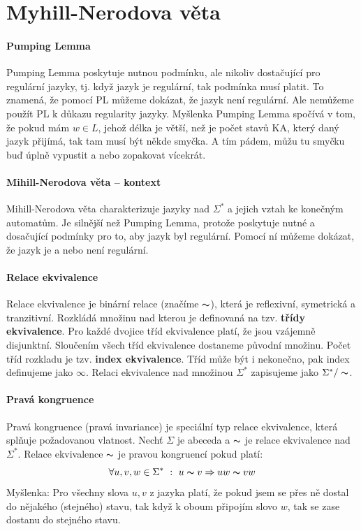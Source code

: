 
\section{Myhill-Nerodova věta}

\paragraph*{Pumping Lemma} Pumping Lemma poskytuje nutnou podmínku, ale nikoliv dostačující pro regulární jazyky, tj. když jazyk je regulární, tak podmínka musí platit. To znamená, že pomocí PL můžeme dokázat, že jazyk není regulární. Ale nemůžeme použít PL k důkazu regularity jazyky. Myšlenka Pumping Lemma spočívá v tom, že pokud mám $w \in L$, jehož délka je větší, než je počet stavů KA, který daný jazyk přijímá, tak tam musí být někde smyčka. A tím pádem, můžu tu smyčku buď úplně vypustit a nebo zopakovat vícekrát.

\paragraph*{Mihill-Nerodova věta -- kontext} Mihill-Nerodova věta charakterizuje jazyky nad $\Sigma^*$ a jejich vztah ke konečným automatům. Je silnější než Pumping Lemma, protože poskytuje nutné a dosačující podmínky pro to, aby jazyk byl regulární. Pomocí ní můžeme dokázat, že jazyk je a nebo není regulární.

\paragraph*{Relace ekvivalence} Relace ekvivalence je binární relace (značíme $\thicksim$), která je reflexivní, symetrická a tranzitivní. Rozkládá množinu nad kterou je definovaná na tzv. \textbf{třídy ekvivalence}. Pro každé dvojice tříd ekvivalence platí, že jsou vzájemně disjunktní. Sloučením všech tříd ekvivalence dostaneme původní množinu. Počet tříd rozkladu je tzv. \textbf{index ekvivalence}. Tříd může být i nekonečno, pak index definujeme jako $\infty$. Relaci ekvivalence nad množinou $\Sigma^*$ zapisujeme jako $\Sigma^* / \thicksim$.

\paragraph*{Pravá kongruence} Pravá kongruence (pravá invariance) je speciální typ relace ekvivalence, která splňuje požadovanou vlatnost. Nechť $\Sigma$ je abeceda a $\thicksim$ je relace ekvivalence nad $\Sigma^*$. Relace ekvivalence $\thicksim$ je pravou kongruencí pokud platí: $$ \forall u, v, w \in \Sigma^* ~:~ u \thicksim v \Rightarrow uw \thicksim vw $$
Myšlenka: Pro všechny slova $u, v$ z jazyka platí, že pokud jsem se přes ně dostal do nějakého (stejného) stavu, tak když k oboum připojím slovo $w$, tak se zase dostanu do stejného stavu.

